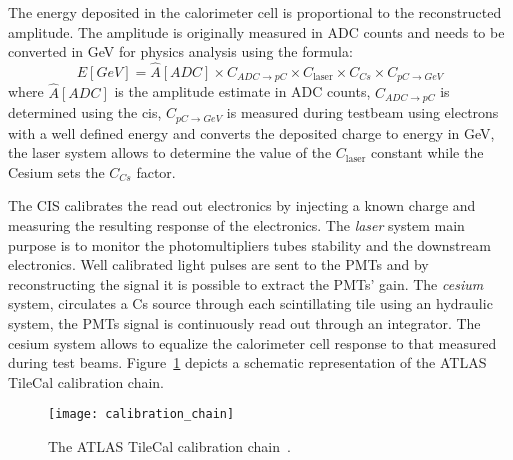 The energy deposited in the calorimeter cell is proportional to the
reconstructed amplitude. The amplitude is originally measured in ADC counts and
needs to be converted in GeV for physics analysis using the formula:
\begin{equation}
  \label{eq:70}
  E[GeV] = \hat{A}[ADC] \times C_{ADC \rightarrow pC} \times C_{\text{laser}}
  \times C_{Cs} \times C_{pC \rightarrow GeV}
\end{equation}
where $\hat{A}[ADC]$ is the amplitude estimate in ADC counts, $C_{ADC \rightarrow
pC}$ is determined using the \gls{cis}, $C_{pC \rightarrow
  GeV}$ is measured during testbeam using electrons with a well defined energy
and converts the deposited charge to energy in GeV, the laser system allows to
determine the value of the $C_{\text{laser}}$ constant while the Cesium sets the
$C_{Cs}$ factor.

The CIS calibrates the read out electronics by injecting a known charge and
measuring the resulting response of the electronics. The \emph{laser} system
main purpose is to monitor the photomultipliers tubes stability and the
downstream electronics. Well calibrated light pulses are sent to the PMTs and by
reconstructing the signal it is possible to extract the PMTs' gain. The
\emph{cesium} system, circulates a Cs source through each scintillating tile
using an hydraulic system, the PMTs signal is continuously read out through an
integrator. The cesium system allows to equalize the calorimeter cell response
to that measured during test beams. Figure~\ref{fig:cali_chain} depicts a
schematic representation of the ATLAS TileCal calibration chain.

\begin{figure}[!h]
  \centering
    \texttt{[image: calibration\_chain]}
    \caption{The ATLAS TileCal calibration chain~\cite{TileCalibChain}.}
    \label{fig:cali_chain}
\end{figure}
